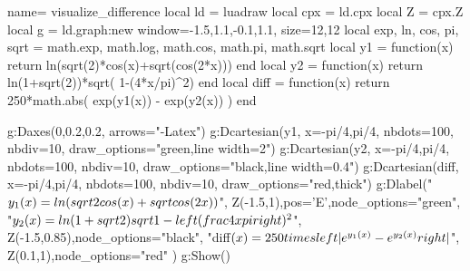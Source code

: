 \documentclass{standalone}%
\begin{document}
\begin{luadraw}{name= visualize_difference}
local ld = luadraw
local cpx = ld.cpx
local Z = cpx.Z
local g = ld.graph:new{ window={-1.5,1.1,-0.1,1.1}, size={12,12} }
local exp, ln, cos, pi, sqrt = math.exp, math.log, math.cos, math.pi, math.sqrt
local y1 = function(x) return ln(sqrt(2)*cos(x)+sqrt(cos(2*x))) end
local y2 = function(x) return ln(1+sqrt(2))*sqrt( 1-(4*x/pi)^2) end
local diff = function(x) return 250*math.abs( exp(y1(x)) - exp(y2(x)) ) end

g:Daxes({0,0.2,0.2}, {arrows="-Latex"})
g:Dcartesian(y1, {x={-pi/4,pi/4}, nbdots=100, nbdiv=10, draw_options="green,line width=2"})
g:Dcartesian(y2, {x={-pi/4,pi/4}, nbdots=100, nbdiv=10, draw_options="black,line width=0.4"})
g:Dcartesian(diff, {x={-pi/4,pi/4}, nbdots=100, nbdiv=10, draw_options="red,thick"})
g:Dlabel("$y_1(x)=\\ln(\\sqrt{2}\\cos(x)+\\sqrt{\\cos(2x)})$", Z(-1.5,1),{pos='E',node_options="green"},
"$y_2(x)=\\ln(1+\\sqrt 2)\\sqrt{ 1-\\left( \\frac{4x}{\\pi}\\right)^2}$", Z(-1.5,0.85),{node_options="black"},
    "diff$(x)=250\\times\\left| e^{y_1(x)} - e^{y_2(x)} \\right|$", Z(0.1,1),{node_options="red"}
)
g:Show()
\end{luadraw}
\end{document}
